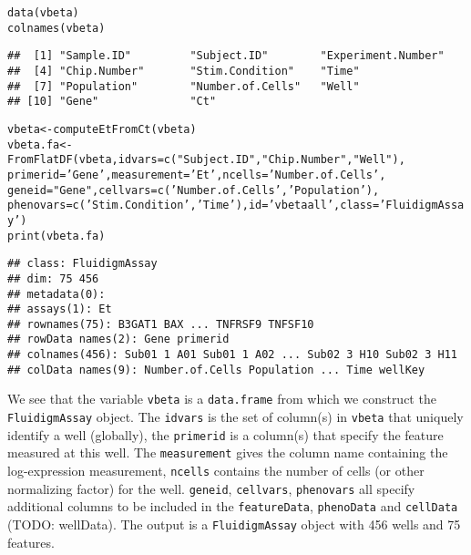 \documentclass{article}\usepackage[]{graphicx}\usepackage[usenames,dvipsnames]{color}
\newcommand{\hlstr}[1]{\textcolor[rgb]{0.251,0.627,0.251}{#1}}%
\newcommand{\hlstd}[1]{\textcolor[rgb]{0.251,0.251,0.251}{#1}}%
\newcommand{\hlkwb}[1]{\textcolor[rgb]{0,0,0}{#1}}%
\newcommand{\hlkwc}[1]{\textcolor[rgb]{0.251,0.251,0.251}{#1}}%
\newcommand{\hlkwd}[1]{\textcolor[rgb]{0.878,0.439,0.125}{#1}}%
\newenvironment{knitrout}{}{} %
\newcommand{\future}[1]{TODO: {\color{gray} #1}}
\begin{document}
\begin{knitrout}
\begin{kframe}
{\ttfamily\noindent\itshape\color{messagecolor}{\#\# The following objects are masked from 'package:S4Vectors':\\\#\# \\\#\#\ \ \ \  first, second}}\begin{alltt}
\hlkwd{data}\hlstd{(vbeta)}
\hlkwd{colnames}\hlstd{(vbeta)}
\end{alltt}
\begin{verbatim}
##  [1] "Sample.ID"         "Subject.ID"        "Experiment.Number"
##  [4] "Chip.Number"       "Stim.Condition"    "Time"             
##  [7] "Population"        "Number.of.Cells"   "Well"             
## [10] "Gene"              "Ct"
\end{verbatim}
\begin{alltt}
\hlstd{vbeta} \hlkwb{<-} \hlkwd{computeEtFromCt}\hlstd{(vbeta)}
\hlstd{vbeta.fa} \hlkwb{<-} \hlkwd{FromFlatDF}\hlstd{(vbeta,} \hlkwc{idvars}\hlstd{=}\hlkwd{c}\hlstd{(}\hlstr{"Subject.ID"}\hlstd{,} \hlstr{"Chip.Number"}\hlstd{,} \hlstr{"Well"}\hlstd{),}
                          \hlkwc{primerid}\hlstd{=}\hlstr{'Gene'}\hlstd{,} \hlkwc{measurement}\hlstd{=}\hlstr{'Et'}\hlstd{,} \hlkwc{ncells}\hlstd{=}\hlstr{'Number.of.Cells'}\hlstd{,}
                          \hlkwc{geneid}\hlstd{=}\hlstr{"Gene"}\hlstd{,}  \hlkwc{cellvars}\hlstd{=}\hlkwd{c}\hlstd{(}\hlstr{'Number.of.Cells'}\hlstd{,} \hlstr{'Population'}\hlstd{),}
                          \hlkwc{phenovars}\hlstd{=}\hlkwd{c}\hlstd{(}\hlstr{'Stim.Condition'}\hlstd{,}\hlstr{'Time'}\hlstd{),} \hlkwc{id}\hlstd{=}\hlstr{'vbeta all'}\hlstd{,} \hlkwc{class}\hlstd{=}\hlstr{'FluidigmAssay'}\hlstd{)}
\hlkwd{print}\hlstd{(vbeta.fa)}
\end{alltt}
\begin{verbatim}
## class: FluidigmAssay 
## dim: 75 456 
## metadata(0):
## assays(1): Et
## rownames(75): B3GAT1 BAX ... TNFRSF9 TNFSF10
## rowData names(2): Gene primerid
## colnames(456): Sub01 1 A01 Sub01 1 A02 ... Sub02 3 H10 Sub02 3 H11
## colData names(9): Number.of.Cells Population ... Time wellKey
\end{verbatim}
\end{kframe}
\end{knitrout}

We see that the variable \texttt{vbeta} is a \texttt{data.frame} from which we
construct the \texttt{FluidigmAssay} object. 
The \texttt{idvars} is the set of column(s) in \texttt{vbeta} that uniquely
identify a well (globally), the \texttt{primerid} is a column(s) that specify the feature measured at this well.
The \texttt{measurement} gives the column name containing the log-expression
measurement, \texttt{ncells} contains the number of cells (or other
normalizing factor) for the well.
\texttt{geneid}, \texttt{cellvars}, \texttt{phenovars} all specify additional
columns to be included in the \texttt{featureData}, \texttt{phenoData}  and
\texttt{cellData} (\future{wellData}). The output is a \texttt{FluidigmAssay}
object with 456 wells and 75 features. 
\end{document}

